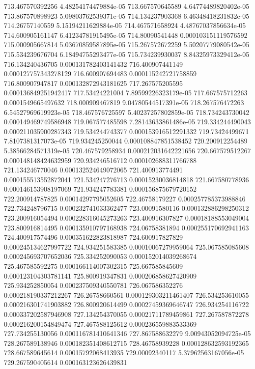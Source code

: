 {713.467570392256 4.48254174479884e-05
713.667570645589 4.64774489820402e-05
713.867570898923 5.09803762539371e-05
714.134237903368 6.46348418231832e-05
714.26757140559 5.15194211629884e-05
714.467571658924 4.48767037856634e-05
714.600905161147 6.41234781915495e-05
714.80090541448 0.000103151119576592
715.000905667814 5.03670859587895e-05
715.267572672259 5.50207779080542e-05
715.534239676704 6.18494755293477e-05
715.734239930037 8.84325973329412e-05
716.134240436705 0.000131782403141432
716.400907441149 0.000127757343278129
716.600907694483 0.000115242721758859
716.800907947817 0.000132872943181625
717.267575205595 0.000136849251942417
717.53424221004 7.89599226323179e-05
717.667575712263 0.0001549665497632
718.000909467819 9.04780544517391e-05
718.267576472263 6.54527969619923e-05
718.467576725597 5.40237257802859e-05
718.734243730042 0.000149469749586948
719.067577485598 7.28143633861486e-05
719.334244490043 0.000211035900287343
719.534244743377 0.000153916512291332
719.73424499671 7.8107381317073e-05
719.934245250044 0.000108847851538452
720.200912254489 5.38566284571319e-05
720.467579258934 0.000212031642221656
720.667579512267 0.000148148424632959
720.934246516712 0.000102688311766788
721.134246770046 0.000132524649072065
721.400913774491 0.000155513552872041
721.534247276713 0.00015230036814818
721.667580778936 0.000146153908197069
721.934247783381 0.000156875679720152
722.200914787825 0.00014297795052605
722.46758179227 0.000257785373988846
722.734248796715 0.000232741033362477
723.00091580116 0.000132886298250312
723.200916054494 0.000228316045273263
723.400916307827 0.00018188553049004
723.800916814495 0.000135910797168938
724.06758381894 0.000255170692941163
724.400917574496 0.000351622823818987
724.600917827829 0.000245134627997722
724.934251583385 0.00010067279959064
725.067585085608 0.000245693707652036
725.334252090053 0.000152014039268674
725.467585592275 0.000166114007302315
725.667585845609 0.000123104303781141
725.800919347831 0.000206858627420909
725.934252850054 0.000237509340550781
726.067586352276 0.000218190337212267
726.26758660561 0.000129303211461407
726.534253610055 0.000216301741903882
726.800920614499 0.00027459369646747
726.934254116722 0.000337202587946908
727.134254370055 0.00021711789459861
727.267587872278 0.000216200154849474
727.467588125612 0.000236559883533369
727.734255130056 0.000116781410641346
727.867588632279 9.00943052094725e-05
728.267589138946 0.000182351408612715
728.46758939228 0.000128632593192365
728.667589645614 0.00015792068413935
729.00092340117 5.37962563167056e-05
729.267590405614 0.000163123626439831
}
